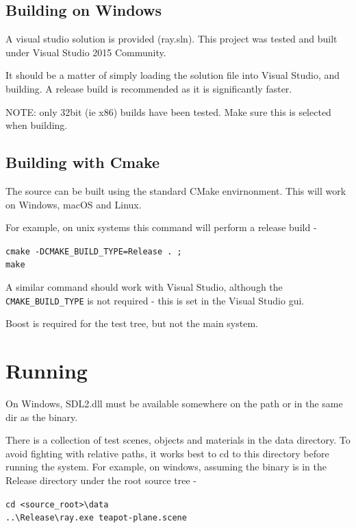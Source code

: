 \subsection{Building on Windows}
A visual studio solution is provided (ray.sln). This project was tested and built under Visual Studio 2015 Community. 

It should be a matter of simply loading the solution file into Visual Studio, and building. A release build is recommended as it is significantly faster.

NOTE: only 32bit (ie x86) builds have been tested. Make sure this is selected when building.

\subsection{Building with Cmake}
The source can be built using the standard CMake envirnonment. This will work on Windows, macOS and Linux. 

For example, on unix systems this command will perform a release build -

\verb|cmake -DCMAKE_BUILD_TYPE=Release . ;| \\
\verb|make|

A similar command should work with Visual Studio, although the \verb|CMAKE_BUILD_TYPE| is not required - this is set in the Visual Studio gui.


Boost is required for the test tree, but not the main system.

\section{Running}

On Windows, SDL2.dll must be available somewhere on the path or in the same dir as the binary. 

There is a collection of test scenes, objects and materials in the data directory. To avoid fighting with relative paths, it works best to cd to this directory before running the system. For example, on windows, assuming the binary is in the Release directory under the root source tree - 

\verb|cd <source_root>\data| \\
\verb|..\Release\ray.exe teapot-plane.scene|

